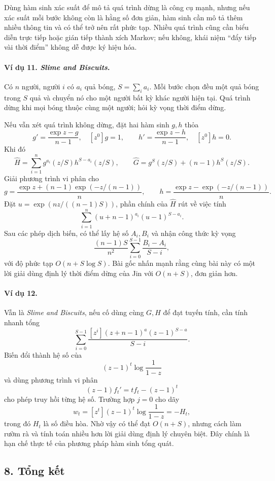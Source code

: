 \documentclass[11pt]{article}
\begin{document}
Dùng hàm sinh xác suất để mô tả quá trình dừng là công cụ mạnh, nhưng nếu xác
suất mỗi bước không còn là hằng số đơn giản, hàm sinh cần mô tả thêm nhiều
thông tin và có thể trở nên rất phức tạp. Nhiều quá trình cũng cần biểu diễn
trực tiếp hoặc gián tiếp thành xích Markov; nếu không, khái niệm ``đẩy tiếp vài
thời điểm'' không dễ được ký hiệu hóa.

\paragraph{Ví dụ 11. \emph{Slime and Biscuits}.}
Có \(n\) người, người \(i\) có \(a_i\) quả bóng, \(S=\sum_i a_i\). Mỗi bước
chọn đều một quả bóng trong \(S\) quả và chuyển nó cho một người bất kỳ khác
người hiện tại. Quá trình dừng khi mọi bóng thuộc cùng một người; hỏi kỳ vọng
thời điểm dừng.

Nếu vẫn xét quá trình không dừng, đặt hai hàm sinh \(g,h\) thỏa
\[
  g'=\frac{\exp z-g}{n-1},\quad [z^0]g=1,\qquad
  h'=\frac{\exp z-h}{n-1},\quad [z^0]h=0.
\]
Khi đó
\[
  \widehat H=\sum_{i=1}^n g^{a_i}(z/S)h^{S-a_i}(z/S),
  \qquad
  \widehat G=g^S(z/S)+(n-1)h^S(z/S).
\]
Giải phương trình vi phân cho
\[
  g=\frac{\exp z+(n-1)\exp(-z/(n-1))}{n},\qquad
  h=\frac{\exp z-\exp(-z/(n-1))}{n}.
\]
Đặt \(u=\exp(nz/((n-1)S))\), phần chính của \(\widehat H\) rút về việc tính
\[
  \sum_{i=1}^n (u+n-1)^{a_i}(u-1)^{S-a_i}.
\]
Sau các phép dịch biến, có thể lấy hệ số \(A_i,B_i\) và nhận công thức kỳ vọng
\[
  \frac{(n-1)S}{n^2}\sum_{i=0}^{S-1}\frac{B_i-A_i}{S-i},
\]
với độ phức tạp \(O(n+S\log S)\). Bài gốc nhấn mạnh rằng cùng bài này có một
lời giải dùng định lý thời điểm dừng của Jin với \(O(n+S)\), đơn giản hơn.

\paragraph{Ví dụ 12.}
Vẫn là \emph{Slime and Biscuits}, nếu cố dùng cùng \(G,H\) để đạt tuyến tính,
cần tính nhanh tổng
\[
  \sum_{i=0}^{S-1}\frac{[z^i](z+n-1)^a(z-1)^{S-a}}{S-i}.
\]
Biến đổi thành hệ số của
\[
  (z-1)^t\log\frac1{1-z}
\]
và dùng phương trình vi phân
\[
  (z-1)f_t'=tf_t-(z-1)^t
\]
cho phép truy hồi từng hệ số. Trường hợp \(j=0\) cho dãy
\[
  w_t=[z^t](z-1)^t\log\frac1{1-z}=-H_t,
\]
trong đó \(H_t\) là số điều hòa. Nhờ vậy có thể đạt \(O(n+S)\), nhưng cách làm
rườm rà và tính toán nhiều hơn lời giải dùng định lý chuyên biệt. Đây chính là
hạn chế thực tế của phương pháp hàm sinh tổng quát.

\subsection*{8. Tổng kết}
\end{document}
